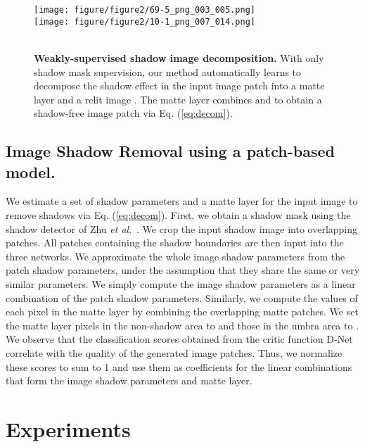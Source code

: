 \documentclass[runningheads]{llncs}
\def\etal{\emph{et al}.}
\begin{document}
\def\subfig{0.9\textwidth}
\def\subboxsize{0.15\textwidth}
\begin{figure*}[!h]
 \centering
 \texttt{[image: figure/figure2/69-5\_png\_003\_005.png]}\\
\texttt{[image: figure/figure2/10-1\_png\_007\_014.png]}\\
    \makebox[\subboxsize]{}
    \makebox[\subboxsize]{}
    \makebox[\subboxsize]{}
    \makebox[\subboxsize]{}
    \makebox[\subboxsize]{ }
    \makebox[\subboxsize]{}\\
     \caption{\textbf{Weakly-supervised shadow image decomposition.} With only shadow mask supervision, our method automatically learns to decompose the shadow effect in the input image patch  into a matte layer  and a relit image . The matte layer  combines   and  to obtain a shadow-free image patch  via Eq. (\ref{eq:decom}).
    }
 
    \label{fig:decompose}

\end{figure*}

\subsection{Image Shadow Removal using a patch-based model.}
\label{sec:method_im}

We estimate a set of shadow parameters and a matte layer for the input image to remove shadows via Eq. (\ref{eq:decom}). First, we obtain a shadow mask using the shadow detector of Zhu \etal~\cite{zhu18b}. We crop the input shadow image into overlapping patches. All patches containing the shadow boundaries  are then input into the three networks. We approximate the whole image shadow parameters from the patch shadow parameters, under the assumption that they share the same or very similar parameters. We simply compute the image shadow parameters as a linear combination of the patch shadow parameters. Similarly, we compute the values of each pixel in the matte layer by combining the overlapping matte patches. We set the matte layer pixels in the non-shadow area to  and those in the umbra area to . We observe that the classification scores obtained from the critic function D-Net correlate with the quality of the generated image patches. Thus, we normalize these scores to sum to 1 and use them as coefficients for the linear combinations that form the image shadow parameters and matte layer.

\section{Experiments}
\end{document}
